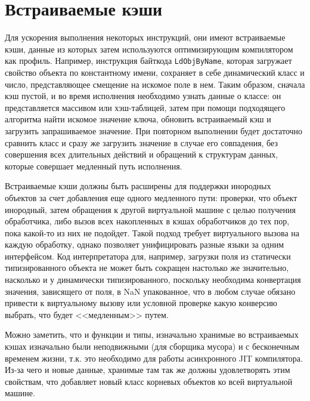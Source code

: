 \documentclass[times
]{itmo-student-thesis}
\begin{document}
\section{Встраиваемые кэши}
Для ускорения выполнения некоторых инструкций, они имеют встраиваемые кэши, данные из которых затем используются оптимизирующим компилятором как профиль. Например, инструкция байткода \texttt{LdObjByName}, которая загружает свойство объекта по константному имени, сохраняет в себе динамический класс и число, представляющее смещение на искомое поле в нем. Таким образом, сначала кэш пустой, и во время исполнения необходимо узнать данные о классе: он представляется массивом или хэш-таблицей, затем при помощи подходящего алгоритма найти искомое значение ключа, обновить встраиваемый кэш и загрузить запрашиваемое значение. При повторном выполнении будет достаточно сравнить класс и сразу же загрузить значение в случае его совпадения, без совершения всех длительных действий и обращений к структурам данных, которые совершает медленный путь исполнения.

Встраиваемые кэши должны быть расширены для поддержки инородных объектов за счет добавления еще одного медленного пути: проверки, что объект инородный, затем обращения к другой виртуальной машине с целью получения обработчика, либо вызов всех накопленных в кэшах обработчиков до тех пор, пока какой-то из них не подойдет. Такой подход требует виртуального вызова на каждую обработку, однако позволяет унифицировать разные языки за одним интерфейсом. Код интерпретатора для, например, загрузки поля из статически типизированного объекта не может быть сокращен настолько же значительно, насколько и у динамически типизированного, поскольку необходима конвертация значения, зависящего от поля, в NaN упакованное, что в любом случае обязано привести к виртуальному вызову или условной проверке какую конверсию выбрать, что будет <<медленным>> путем.

Можно заметить, что и функции и типы, изначально хранимые во встраиваемых кэшах изначально были неподвижными (для сборщика мусора) и с бесконечным временем жизни, т.к. это необходимо для работы асинхронного JIT компилятора. Из-за чего и новые данные, хранимые там так же должны удовлетворять этим свойствам, что добавляет новый класс корневых объектов ко всей виртуальной машине.
\end{document}

